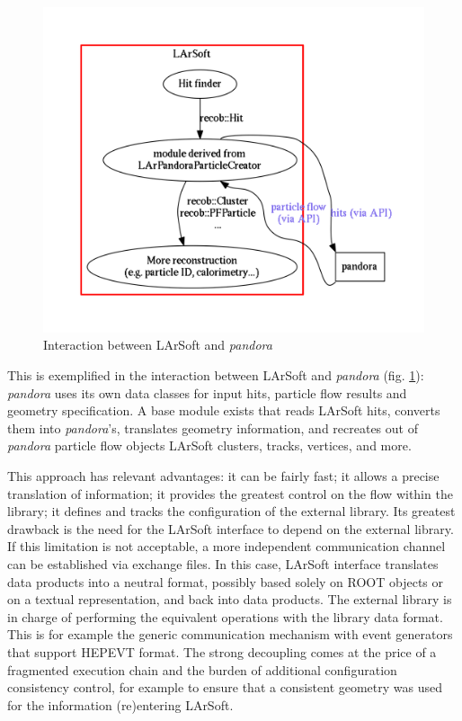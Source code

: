 \documentclass{article}
\begin{document}
\begin{figure}[htbp]
\centering
\includegraphics[width=\textwidth]{figures/LArSoftAndPandora.pdf}
\caption{\label{fig:LArSoftAndPandora}Interaction between LArSoft and
\emph{pandora}}
\end{figure}

This is exemplified in the interaction between LArSoft and
\emph{pandora} (fig. \ref{fig:LArSoftAndPandora}): \emph{pandora} uses
its own data classes for input hits, particle flow results and geometry
specification. A base module exists that reads LArSoft hits, converts
them into \emph{pandora}'s, translates geometry information, and
recreates out of \emph{pandora} particle flow objects LArSoft clusters,
tracks, vertices, and more.

This approach has relevant advantages: it can be fairly fast; it allows
a precise translation of information; it provides the greatest control
on the flow within the library; it defines and tracks the configuration
of the external library. Its greatest drawback is the need for the
LArSoft interface to depend on the external library. If this limitation
is not acceptable, a more independent communication channel can be
established via exchange files. In this case, LArSoft interface
translates data products into a neutral format, possibly based solely on
ROOT objects or on a textual representation, and back into data
products. The external library is in charge of performing the equivalent
operations with the library data format. This is for example the generic
communication mechanism with event generators that support HEPEVT
format. The strong decoupling comes at the price of a fragmented
execution chain and the burden of additional configuration consistency
control, for example to ensure that a consistent geometry was used for
the information (re)entering LArSoft.
\end{document}
